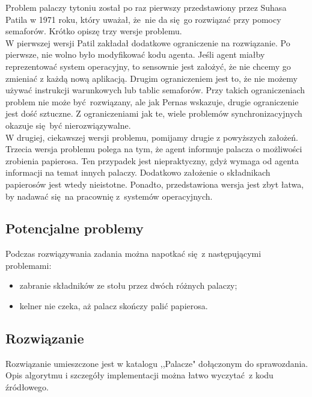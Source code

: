 \documentclass{article}
\begin{document}
Problem palaczy tytoniu został po raz pierwszy przedstawiony przez Suhasa Patila w 1971 roku, który uważał, że~nie da się go rozwiązać przy pomocy semaforów. Krótko opiszę trzy wersje problemu.\\

W pierwszej wersji Patil zakładał dodatkowe ograniczenie na rozwiązanie. Po pierwsze, nie wolno było modyfikować kodu agenta. Jeśli agent miałby reprezentować system operacyjny, to sensownie jest założyć, że nie chcemy go zmieniać z każdą nową aplikacją. Drugim ograniczeniem jest to, że nie możemy używać instrukcji warunkowych lub tablic semaforów. Przy takich ograniczeniach problem nie może być rozwiązany, ale jak Pernas wskazuje, drugie ograniczenie jest dość sztuczne. Z ograniczeniami jak te, wiele problemów synchronizacyjnych okazuje się być nierozwiązywalne.\\

W drugiej, ciekawszej wersji problemu, pomijamy drugie z powyższych założeń.\\

Trzecia wersja problemu polega na tym, że agent informuje palacza o możliwości zrobienia papierosa. Ten przypadek jest niepraktyczny, gdyż wymaga od agenta informacji na temat innych palaczy. Dodatkowo założenie o składnikach papierosów jest wtedy nieistotne. Ponadto, przedstawiona wersja jest zbyt łatwa, by nadawać się na pracownię z~systemów operacyjnych.

\pagebreak

\subsection*{Potencjalne problemy}

Podczas rozwiązywania zadania można napotkać się z następującymi problemami:

\begin{itemize}
\item zabranie składników ze stołu przez dwóch różnych palaczy; 
\item kelner nie czeka, aż palacz skończy palić papierosa.
\end{itemize}

\subsection*{Rozwiązanie}

Rozwiązanie umieszczone jest w katalogu ,,Palacze" dołączonym do sprawozdania.\\ Opis algorytmu i szczegóły implementacji można łatwo wyczytać z kodu źródłowego.
\end{document}
